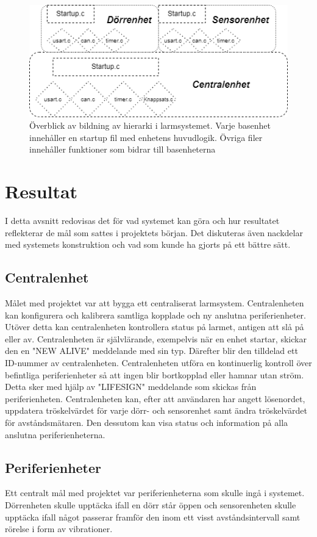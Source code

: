 \documentclass{article}
\begin{document}
\begin{figure}[h]
    \centering
    \includegraphics[scale=0.5]{Projektrapport/hierarki.png}
    \caption {Överblick av bildning av hierarki i larmsystemet. Varje basenhet innehåller en startup fil med enhetens huvudlogik. Övriga filer innehåller funktioner som bidrar till basenheterna}
    \label{fig:drawing}
\end{figure}


\section{Resultat}
I detta avsnitt redovisas det för vad systemet kan göra och hur resultatet reflekterar de mål som sattes i projektets början. 
Det diskuteras även nackdelar med systemets konstruktion och vad som kunde ha gjorts på ett bättre sätt.

\subsection{Centralenhet}
Målet med projektet var att bygga ett centraliserat larmsystem. Centralenheten kan konfigurera och kalibrera samtliga kopplade och ny anslutna periferienheter. Utöver detta kan centralenheten kontrollera status på larmet, antigen att slå på eller av. Centralenheten är självlärande, exempelvis när en enhet startar, skickar den en "NEW ALIVE" meddelande med sin typ. Därefter blir den tilldelad ett ID-nummer av centralenheten. Centralenheten utföra en kontinuerlig kontroll över befintliga periferienheter så att ingen blir bortkopplad eller hamnar utan ström. Detta sker med hjälp av "LIFESIGN" meddelande som skickas från periferienheten. Centralenheten kan, efter att användaren har angett lösenordet, uppdatera tröskelvärdet för varje dörr- och sensorenhet samt ändra tröskelvärdet för avståndsmätaren. Den dessutom kan visa status och information på alla anslutna periferienheterna.

\subsection{Periferienheter}
Ett centralt mål med projektet var periferienheterna som skulle ingå i systemet. 
Dörrenheten skulle upptäcka ifall en dörr står öppen och sensorenheten skulle upptäcka ifall något passerar framför den inom ett visst avståndsintervall samt rörelse i form av vibrationer.
\end{document}
